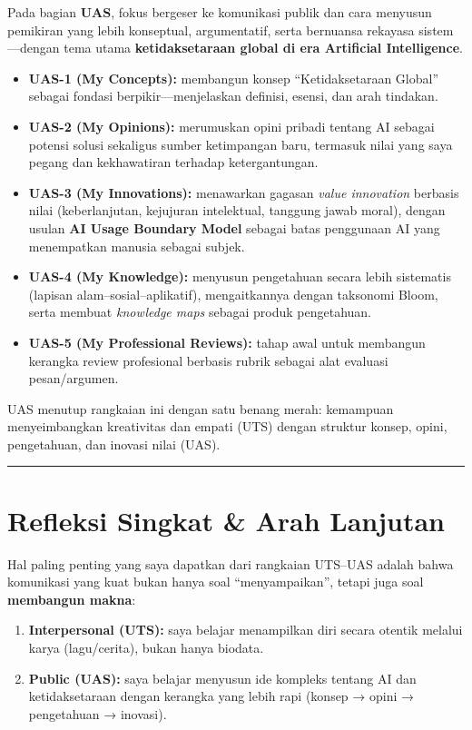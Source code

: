 \documentclass[
  letterpaper,
  DIV=11,
  numbers=noendperiod]{scrreprt}
\providecommand{\tightlist}{%
  \setlength{\itemsep}{0pt}\setlength{\parskip}{0pt}}
\begin{document}
Pada bagian \textbf{UAS}, fokus bergeser ke komunikasi publik dan cara
menyusun pemikiran yang lebih konseptual, argumentatif, serta bernuansa
rekayasa sistem---dengan tema utama \textbf{ketidaksetaraan global di
era Artificial Intelligence}.

\begin{itemize}
\tightlist
\item
  \textbf{UAS-1 (My Concepts):} membangun konsep ``Ketidaksetaraan
  Global'' sebagai fondasi berpikir---menjelaskan definisi, esensi, dan
  arah tindakan.
\item
  \textbf{UAS-2 (My Opinions):} merumuskan opini pribadi tentang AI
  sebagai potensi solusi sekaligus sumber ketimpangan baru, termasuk
  nilai yang saya pegang dan kekhawatiran terhadap ketergantungan.
\item
  \textbf{UAS-3 (My Innovations):} menawarkan gagasan \emph{value
  innovation} berbasis nilai (keberlanjutan, kejujuran intelektual,
  tanggung jawab moral), dengan usulan \textbf{AI Usage Boundary Model}
  sebagai batas penggunaan AI yang menempatkan manusia sebagai subjek.
\item
  \textbf{UAS-4 (My Knowledge):} menyusun pengetahuan secara lebih
  sistematis (lapisan alam--sosial--aplikatif), mengaitkannya dengan
  taksonomi Bloom, serta membuat \emph{knowledge maps} sebagai produk
  pengetahuan.
\item
  \textbf{UAS-5 (My Professional Reviews):} tahap awal untuk membangun
  kerangka review profesional berbasis rubrik sebagai alat evaluasi
  pesan/argumen.
\end{itemize}

UAS menutup rangkaian ini dengan satu benang merah: kemampuan
menyeimbangkan kreativitas dan empati (UTS) dengan struktur konsep,
opini, pengetahuan, dan inovasi nilai (UAS).

\begin{center}\rule{0.5\linewidth}{0.5pt}\end{center}

\section{Refleksi Singkat \& Arah
Lanjutan}\label{refleksi-singkat-arah-lanjutan}

Hal paling penting yang saya dapatkan dari rangkaian UTS--UAS adalah
bahwa komunikasi yang kuat bukan hanya soal ``menyampaikan'', tetapi
juga soal \textbf{membangun makna}:

\begin{enumerate}
\def\labelenumi{\arabic{enumi}.}
\tightlist
\item
  \textbf{Interpersonal (UTS):} saya belajar menampilkan diri secara
  otentik melalui karya (lagu/cerita), bukan hanya biodata.
\item
  \textbf{Public (UAS):} saya belajar menyusun ide kompleks tentang AI
  dan ketidaksetaraan dengan kerangka yang lebih rapi (konsep → opini →
  pengetahuan → inovasi).
\end{enumerate}
\end{document}
